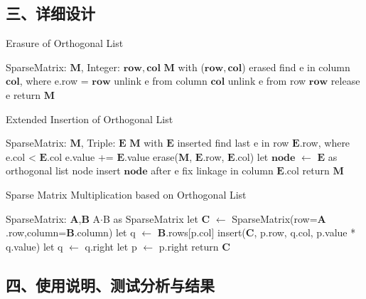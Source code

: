 \documentclass[UTF8, a4paper]{ctexart}
\begin{document}
\subsection*{三、详细设计}
\begin{algorithm}[H]
\begin{algorithmic}[1]
\caption{Erasure of Orthogonal List}
\Require SparseMatrix: $\mathbf{M}$, Integer: $\mathbf{row},\mathbf{col}$
\Ensure $\mathbf{M}$ with ($\mathbf{row},\mathbf{col}$) erased
\State find e in column $\mathbf{col}$, where e.row = $\mathbf{row}$
	\State unlink e from column $\mathbf{col}$
	\State unlink e from row $\mathbf{row}$
	\State release e
\EndIf
\State return $\mathbf{M}$
\end{algorithmic}
\end{algorithm}

\begin{algorithm}[H]
\begin{algorithmic}[1]
\caption{Extended Insertion of Orthogonal List}
\Require SparseMatrix: $\mathbf{M}$, Triple: $\mathbf{E}$
\Ensure $\mathbf{M}$ with $\mathbf{E}$ inserted
\State find last e in row $\mathbf{E}$.row, where e.col < $\mathbf{E}$.col
	\State e.value += $\mathbf{E}$.value
		\State erase($\mathbf{M}$, $\mathbf{E}$.row, $\mathbf{E}$.col)
	\EndIf
\Else
	\State let $\mathbf{node}$ $\leftarrow$ $\mathbf{E}$ as orthogonal list node
	\State insert $\mathbf{node}$ after e
	\State fix linkage in column $\mathbf{E}$.col
\EndIf
\State return $\mathbf{M}$
\end{algorithmic}
\end{algorithm}

\begin{algorithm}[H]
\begin{algorithmic}[1]
\caption{Sparse Matrix Multiplication based on Orthogonal List}
\Require SparseMatrix: $\mathbf{A}$,$\mathbf{B}$
\Ensure A$\cdot$B as SparseMatrix
\State let $\mathbf{C}$ $\leftarrow$ SparseMatrix(row=$\mathbf{A}$.row,column=$\mathbf{B}$.column)
		\State let q $\leftarrow$ $\mathbf{B}$.rows[p.col]
			\State insert($\mathbf{C}$, p.row, q.col, p.value * q.value)
			\State let q $\leftarrow$ q.right
		\EndWhile
		\State let p $\leftarrow$ p.right
	\EndWhile
\EndFor
\State return $\mathbf{C}$
\end{algorithmic}
\end{algorithm}

\subsection*{四、使用说明、测试分析与结果}
\end{document}
